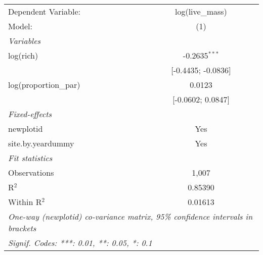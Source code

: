 \begin{tabular}{lc}
\tabularnewline\midrule\midrule
Dependent Variable:&log(live\_mass)\\
Model:&(1)\\
\midrule \emph{Variables}&  \\
log(rich)&-0.2635$^{***}$\\
  &[-0.4435; -0.0836]\\
log(proportion\_par)&0.0123\\
  &[-0.0602; 0.0847]\\
\midrule \emph{Fixed-effects}&  \\
newplotid & Yes\\
site.by.yeardummy & Yes\\
\midrule \emph{Fit statistics}&  \\
Observations & 1,007\\
R$^2$ & 0.85390\\
Within R$^2$ & 0.01613\\
\midrule\midrule\multicolumn{2}{l}{\emph{One-way (newplotid) co-variance matrix, 95\% confidence intervals in brackets}}\\
\multicolumn{2}{l}{\emph{Signif. Codes: ***: 0.01, **: 0.05, *: 0.1}}\\
\end{tabular}


